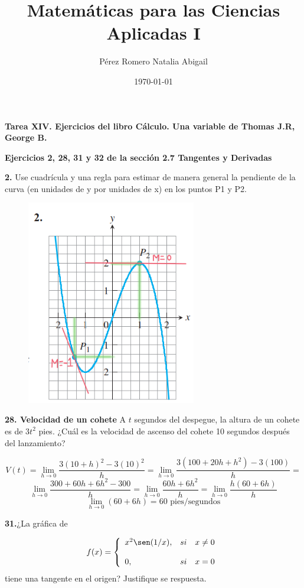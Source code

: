 \documentclass[12pt, letterpaper]{article}
\title{Matemáticas para las Ciencias Aplicadas I}
\author{Pérez Romero Natalia Abigail}
\date{\today}
\begin{document}
\maketitle
\textbf{Tarea XIV. Ejercicios del libro Cálculo. Una variable de Thomas J.R, George B.}

\textbf{Ejercicios 2, 28, 31 y 32 de  la sección 2.7 Tangentes y Derivadas}

\textbf{2.  } Use cuadrícula y una regla para estimar de manera general la pendiente de la curva (en unidades de y por unidades de x) en los puntos P1 y P2. \\

\begin{figure}[tbh]
\centering
\includegraphics[width=20em]{t14uno}
\end{figure}


\textbf{28. Velocidad de un cohete} A $t$ segundos del despegue, la altura de un cohete es de $3t^2$ pies. ¿Cuál es la velocidad de ascenso del cohete 10 segundos después del lanzamiento?

$$V(t) = \lim_{ h \to 0} \frac{3(10+h)^2 - 3(10)^2}{h} =   \lim_{ h \to 0} \frac{3(100+20h+h^2) - 3(100)}{h} = $$
$$\lim_{ h \to 0} \frac{300+60h+6h^2 - 300}{h} = \lim_{ h \to 0} \frac{60h+6h^2}{h}= \lim_{ h \to 0} \frac{h(60 + 6h)}{h} $$
$$\lim_{ h \to 0} (60 + 6h) = 60 \text{ pies/segundos}$$

\textbf{31.}¿La gráfica de

\begin{align*}
f(x)= \left\{ \begin{array}{lcc}
                 x^2 \sen (1/x), &   si   & x \neq 0 \\
             	\\ 0, &   si   & x = 0
             \end{array}
   \right.
\end{align*}
tiene una tangente en el origen? Justifique se respuesta.
\end{document}
